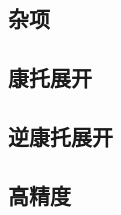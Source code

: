 \documentclass{article}
\begin{document}
\begin{multicols*}{3}
\section{杂项}
\subsection{康托展开}


\subsection{逆康托展开}


\subsection{高精度}


\end{multicols*}
\end{document}
